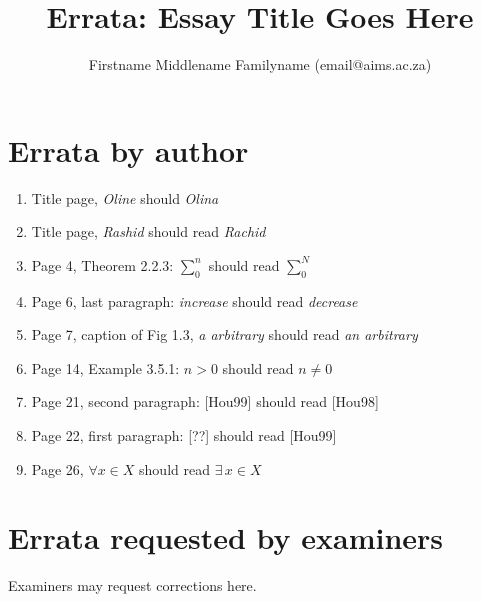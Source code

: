 \documentclass[11pt,a4paper]{article}
\title{Errata: Essay Title Goes Here}
\author{Firstname Middlename Familyname (email@aims.ac.za)}
\date{}
\begin{document}
\maketitle
\section{Errata by author}
\begin{enumerate}
 \item Title page, \textit{Oline} should \textit{Olina}
 \item Title page, \textit{Rashid} should read \textit{Rachid}
 \item Page 4, Theorem 2.2.3: $\sum_0^n$ should read $\sum_0^N$
 \item Page 6, last paragraph: \textit{increase} should read \textit{decrease}
 \item Page 7,  caption of Fig 1.3, \textit{a arbitrary} 
   should read \textit{an arbitrary}
 \item Page 14, Example 3.5.1: $n>0$ should read $n\neq0$
 \item Page 21, second paragraph: [Hou99] should read [Hou98]
 \item Page 22, first paragraph: [??] should read [Hou99]
 \item Page 26, $\forall x\in X$ should read $\exists\, x\in X$
\end{enumerate}

\section{Errata requested by examiners}
Examiners may request corrections here.
\end{document}
